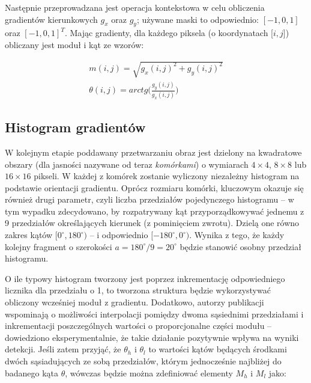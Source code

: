 
Następnie przeprowadzana jest operacja kontekstowa w celu obliczenia gradientów kierunkowych $g_x$ oraz $g_y$; używane maski to odpowiednio: $[-1,0,1]$ oraz $[-1,0,1]^T$. 
Mając gradienty, dla każdego piksela (o koordynatach [$i,j$]) obliczany jest moduł i kąt ze wzorów:

\begin{equation}
\label{eq:HOGangles}
\left.\begin{aligned}
m(i,j)=\sqrt{g_x(i,j)^2+g_y(i,j)^2} \\
\theta(i,j)=arctg\bigg(\frac{g_y(i,j)}{g_x(i,j)}\bigg)
\end{aligned}\right.
\end{equation}

\subsection{Histogram gradientów}

W kolejnym etapie poddawany przetwarzaniu obraz jest dzielony na kwadratowe obszary (dla jasności nazywane od teraz \textit{komórkami}) o wymiarach $4\times4$, $8\times8$ lub $16\times16$ pikseli. 
W każdej z komórek zostanie wyliczony niezależny histogram na podstawie orientacji gradientu. %
Oprócz rozmiaru komórki, kluczowym okazuje się również drugi parametr, czyli liczba przedziałów pojedynczego histogramu -- w tym wypadku zdecydowano, by rozpatrywany kąt przyporządkowywać jednemu z 9 przedziałów określających kierunek (z pominięciem zwrotu). Dzielą one równo zakres kątów $[0^{\circ},180^{\circ})$ -- i odpowiednio $[-180^{\circ},0^{\circ})$. %
Wynika z tego, że każdy kolejny fragment o szerokości $a=180^{\circ}/9=20^{\circ}$ będzie stanowić osobny przedział histogramu. %

O ile typowy histogram tworzony jest poprzez inkrementację odpowiedniego licznika dla przedziału o 1, to tworzona struktura będzie wykorzystywać obliczony wcześniej moduł z gradientu. 
Dodatkowo, autorzy publikacji wspominają o możliwości interpolacji pomiędzy dwoma sąsiednimi przedziałami i inkrementacji poszczególnych wartości o proporcjonalne części modułu -- dowiedziono eksperymentalnie, że takie działanie pozytywnie wpływa na wyniki detekcji. %
Jeśli zatem przyjąć, że $\theta_h$ i $\theta_l$ to wartości kątów będących środkami dwóch sąsiadujących ze sobą przedziałów, którym jednocześnie najbliżej do badanego kąta $\theta$, wówczas będzie można zdefiniować elementy $M_h$ i $M_l$ jako: %

